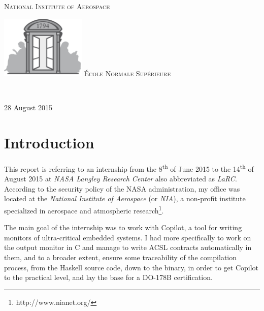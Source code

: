 \documentclass[a4paper,11pt,final]{article}
\begin{document}
\begin{titlepage}
\begin{center}
\begin{minipage}[t]{0.25\textwidth}
\begin{flushleft}
					\textsc{\LARGE National Institute of Aerospace}
				\end{flushleft}
			\end{minipage}
			\begin{minipage}[t]{0.25\textwidth}
				\begin{flushleft}
					\includegraphics[height=30mm]{images/ENS-logo.jpg}
					\textsc{\LARGE École Normale Supérieure}
				\end{flushleft}
			\end{minipage} \\[1.5cm]
			\vfill
			
			{\large 28 August 2015}
			
		\end{center}
		
	\end{titlepage}
	
	
	\cleardoublepage %
	\section*{Introduction}
	This report is referring to an internship from the 8\textsuperscript{th} of June 2015 to the 14\textsuperscript{th} of August 2015 at \emph{NASA Langley Research Center} also abbreviated as \emph{LaRC}. According to the security policy of the NASA administration, my office was located at the \emph{National Institute of Aerospace} (or \emph{NIA}), a non-profit institute specialized in aerospace and atmospheric research\footnote{http://www.nianet.org/}. 
	
	The main goal of the internship was to work with Copilot, a tool for writing monitors of ultra-critical embedded systems. I had more specifically to work on the output monitor in C and manage to write ACSL contracts automatically in them, and to a broader extent, ensure some traceability of the compilation process, from the Haskell source code, down to the binary, in order to get Copilot to the practical level, and lay the base for a DO-178B certification.
	
	\tableofcontents %
	\sloppy          %
	
\end{document}
